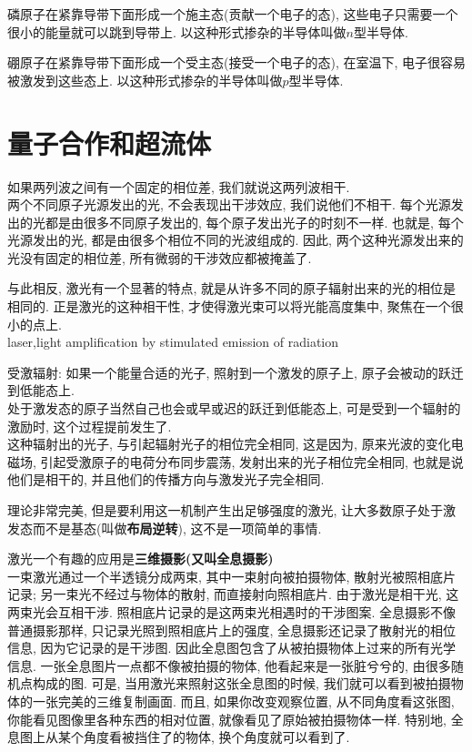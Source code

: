 \documentclass{article}
\begin{document}
磷原子在紧靠导带下面形成一个施主态(贡献一个电子的态), 这些电子只需要一个很小的能量就可以跳到导带上. 以这种形式掺杂的半导体叫做$n$型半导体.\par
硼原子在紧靠导带下面形成一个受主态(接受一个电子的态), 在室温下, 电子很容易被激发到这些态上. 以这种形式掺杂的半导体叫做$p$型半导体.

\section{量子合作和超流体}
如果两列波之间有一个固定的相位差, 我们就说这两列波相干.\\
两个不同原子光源发出的光, 不会表现出干涉效应, 我们说他们不相干. 每个光源发出的光都是由很多不同原子发出的, 每个原子发出光子的时刻不一样.
也就是, 每个光源发出的光, 都是由很多个相位不同的光波组成的. 因此, 两个这种光源发出来的光没有固定的相位差, 所有微弱的干涉效应都被掩盖了.

与此相反, 激光有一个显著的特点, 就是从许多不同的原子辐射出来的光的相位是相同的. 正是激光的这种相干性, 才使得激光束可以将光能高度集中, 聚焦在一个很小的点上.\\
laser,light amplification by stimulated emission of radiation

受激辐射: 如果一个能量合适的光子, 照射到一个激发的原子上, 原子会被动的跃迁到低能态上.\\
处于激发态的原子当然自己也会或早或迟的跃迁到低能态上, 可是受到一个辐射的激励时, 这个过程提前发生了.\\
这种辐射出的光子, 与引起辐射光子的相位完全相同,
这是因为, 原来光波的变化电磁场, 引起受激原子的电荷分布同步震荡, 发射出来的光子相位完全相同, 也就是说他们是相干的, 并且他们的传播方向与激发光子完全相同.

理论非常完美, 但是要利用这一机制产生出足够强度的激光, 让大多数原子处于激发态而不是基态(叫做\textbf{布局逆转}), 这不是一项简单的事情.

激光一个有趣的应用是\textbf{三维摄影(又叫全息摄影)}\\
一束激光通过一个半透镜分成两束, 其中一束射向被拍摄物体, 散射光被照相底片记录; 另一束光不经过与物体的散射, 而直接射向照相底片. 由于激光是相干光, 这两束光会互相干涉.
照相底片记录的是这两束光相遇时的干涉图案. 全息摄影不像普通摄影那样, 只记录光照到照相底片上的强度, 全息摄影还记录了散射光的相位信息, 因为它记录的是干涉图.
因此全息图包含了从被拍摄物体上过来的所有光学信息. 一张全息图片一点都不像被拍摄的物体, 他看起来是一张脏兮兮的, 由很多随机点构成的图.
可是, 当用激光来照射这张全息图的时候, 我们就可以看到被拍摄物体的一张完美的三维复制画面.
而且, 如果你改变观察位置, 从不同角度看这张图, 你能看见图像里各种东西的相对位置, 就像看见了原始被拍摄物体一样.
特别地, 全息图上从某个角度看被挡住了的物体, 换个角度就可以看到了.
\end{document}
